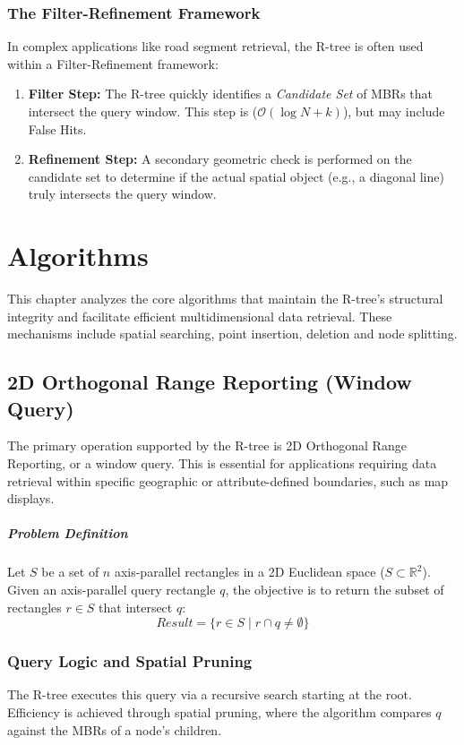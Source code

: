 \documentclass[a4paper, 10pt, titlepage]{report}
\begin{document}
\subsection{The Filter-Refinement Framework}
In complex applications like road segment retrieval, the R-tree is often used within a Filter-Refinement framework:
\begin{enumerate}
    \item \textbf{Filter Step:} The R-tree quickly identifies a \textit{Candidate Set} of MBRs that intersect the query window. This step is ($\mathcal{O}(\log N + k)$), but may include False Hits.
    \item \textbf{Refinement Step:} A secondary geometric check is performed on the candidate set to determine if the actual spatial object (e.g., a diagonal line) truly intersects the query window.
\end{enumerate}

\chapter{Algorithms}

This chapter analyzes the core algorithms that maintain the R-tree’s structural integrity and facilitate efficient multidimensional data retrieval. These mechanisms include spatial searching, point insertion, deletion and node splitting.

\section{2D Orthogonal Range Reporting (Window Query)}
The primary operation supported by the R-tree is 2D Orthogonal Range Reporting, or a window query. This is essential for applications requiring data retrieval within specific geographic or attribute-defined boundaries, such as map displays.

\paragraph{Problem Definition}
Let $S$ be a set of $n$ axis-parallel rectangles in a 2D Euclidean space ($S \subset \mathbb{R}^2$). Given an axis-parallel query rectangle $q$, the objective is to return the subset of rectangles $r \in S$ that intersect $q$:
\[ Result = \{ r \in S \mid r \cap q \neq \emptyset \} \]

\subsection{Query Logic and Spatial Pruning}
The R-tree executes this query via a recursive search starting at the root. Efficiency is achieved through spatial pruning, where the algorithm compares $q$ against the MBRs of a node's children.
\end{document}
